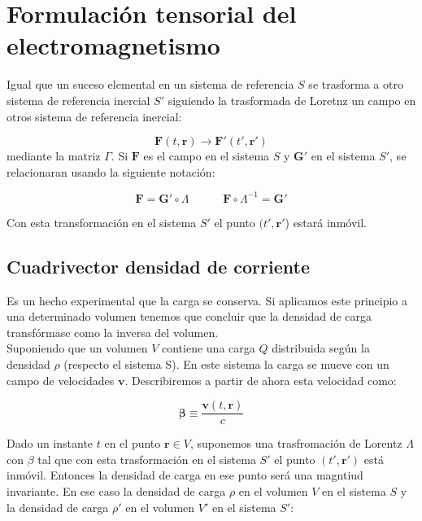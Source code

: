 \documentclass[12pt,a4paper]{article}
\newcommand{\tquad}{\quad \quad \quad}
\newcommand{\Fn}{\mathbf{F}}
\newcommand{\vn}{\mathbf{v}}
\newcommand{\rn}{\mathbf{r}}
\newcommand{\Gn}{\mathbf{G}}
\newcommand{\nbeta}{\boldsymbol{\beta}}
\numberwithin{equation}{section}
\numberwithin{figure}{section}
\begin{document}
\section{Formulación tensorial del electromagnetismo}

Igual que un suceso elemental en un sistema de referencia $S$ se trasforma a otro sistema de referencia inercial $S'$ siguiendo la trasformada de Loretnz un campo en otros sistema de referencia inercial:

\begin{equation}
\Fn (t,\rn) \longrightarrow \Fn' (t',\rn')
\end{equation}
mediante la matriz $\Gamma$. Si $\Fn$ es el campo en el sistema $S$ y $\Gn'$ en el sistema $S'$, se relacionaran usando la siguiente notación:

\begin{equation}
\Fn = \Gn '\circ \Lambda \tquad \Fn \circ \Lambda^{-1} = \Gn'
\end{equation}

Con esta transformación en el sistema $S'$ el punto $(t',\rn'$)  estará inmóvil.

\subsection{Cuadrivector densidad de corriente}

Es un hecho experimental que la carga se conserva. Si aplicamos este principio a una determinado volumen tenemos que concluir que la densidad de carga transfórmase como la inversa del volumen. \\

Suponiendo que un volumen $V$ contiene una carga $Q$ distribuida según la densidad $\rho$ (respecto el sistema S). En este sistema la carga se mueve con un campo de velocidades $\vn$. Describiremos a partir de ahora esta velocidad como:


\begin{equation}
\nbeta \equiv  \dfrac{\vn (t,\rn)}{c}
\end{equation}

Dado un instante $t$ en el punto $\rn \in V$, suponemos una trasfromación de Lorentz $\Lambda$ con $\beta$ tal que con esta trasformación en el sistema $S'$ el punto $(t',\rn')$ está inmóvil. Entonces la densidad de carga en ese punto será una magntiud invariante. En ese caso la densidad de carga $\rho$ en el volumen $V$ en el sistema $S$ y la densidad de carga $\rho'$ en el volumen $V'$ en el sistema $S'$:
\end{document}
